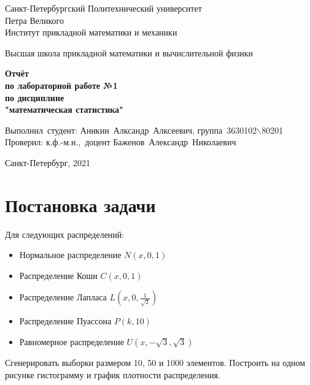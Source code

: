 \documentclass[12pt,a4paper]{article}
\begin{document}
	
	\begin{titlepage}
		
		\begin{center}
			\begin{large}
				Санкт-Петербургский Политехнический университет\\ Петра Великого\\
				Институт прикладной математики и механики\\
			\end{large}
			\vspace{0.2cm}
			Высшая школа прикладной математики и вычислительной физики\\
			
		\end{center}
		
		\vspace{3cm}
		\begin{center}
			\textbf{Отчёт\\ по лабораторной работе №1\\ по дисциплине\\ "математическая статистика"}
		\end{center}
		
		\vspace{3cm}
		
		\vbox{%
			\hfill%
			\vbox{%
				\hbox{Выполнил студент:}%
				\hbox{\break}
				\hbox{Аникин Алксандр Алксеевич,}%
				\hbox{группа 3630102$\backslash$80201}%
				\hbox{\break}
				\hbox{\break}
				\hbox{Проверил:}
				\hbox{\break}
				\hbox{к.ф.-м.н., доцент}
				\hbox{Баженов Александр Николаевич}
			}%
		} 
		\vfill
		
		\begin{center}
			Санкт-Петербург, 2021
		\end{center}
		
	\end{titlepage}
	\tableofcontents
	\newpage
	
	\listoffigures
	\newpage
	
	\section{Постановка задачи}
	Для следующих распределений:
	\begin{itemize}
		\item Нормальное распределение $\textit{N}(\textit{x}, 0, 1)$
		\item Распределение Коши $\textit{C}(\textit{x}, 0, 1)$
		\item Распределение Лапласа $\textit{L}(\textit{x}, 0, \frac{1}{\sqrt{2}})$
		\item Распределение Пуассона $\textit{P}(\textit{k}, 10)$
		\item Равномерное распределение $\textit{U}(\textit{x}, -\sqrt{3}, \sqrt{3})$
	\end{itemize}
	Сгенерировать выборки размером 10, 50 и 1000 элементов. Построить на одном рисунке гистограмму и график плотности распределения.
	\newpage
	
\end{document}
